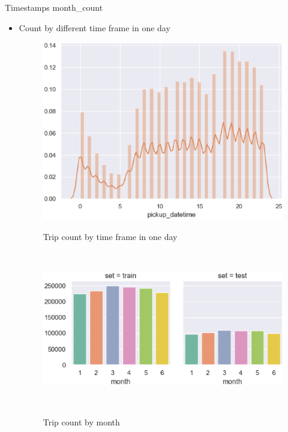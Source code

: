 \documentclass[
 size=12pt,
 paper=smartboard, %
 mode=present, %
 display=slides, %
style=tuliplab,
pauseslide,
fleqn,leqno]{powerdot}
\begin{document}
\begin{slide}{Timestamps} month_count
  \begin{itemize}
    \item Count by different time frame in one day
    \begin{figure}[h]
      \begin{minipage}[t]{0.3\linewidth}
        \centering
        \includegraphics[width=1.0\textwidth]{figures2/pickup_hour_distribution.eps}
        \caption{Trip count by time frame in one day}
        \label{fig:timestamps-picture}
      \end{minipage} 
      \pause
      \hfill
      \begin{minipage}[t]{0.6\linewidth}
        \centering
        \includegraphics[width=1.0\textwidth]{figures2/month_count.eps}
        \caption{Trip count by month}
        \label{fig:count-by-passenger-count-test}
      \end{minipage} 
    \end{figure}

    \begin{figure}[h]
      
    \end{figure}
  \end{itemize}
\end{slide}
\end{document}
